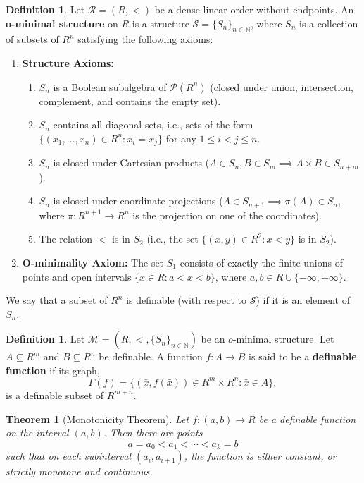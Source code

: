 \documentclass{amsart}
\numberwithin{equation}{subsection}
\theoremstyle{plain}
\newtheorem{thm}[subsection]{Theorem}
\theoremstyle{definition}
\newtheorem{defn}[subsection]{Definition}
\theoremstyle{remark}
\begin{document}
\begin{defn} Let $\mathcal{R}=(R,<)$ be a dense linear order without endpoints. An \textbf{o-minimal structure} on $R$ is a structure $\mathcal{S} = \{S_n\}_{n \in \mathbb{N}}$, where $S_n$ is a collection of subsets of $R^n$ satisfying the following axioms:
\begin{enumerate}
\item \textbf{Structure Axioms:}
\begin{enumerate}
\item $S_n$ is a Boolean subalgebra of $\mathcal{P}(R^n)$ (closed under union, intersection, complement, and contains the empty set).
\item $S_n$ contains all diagonal sets, i.e., sets of the form $\{(x_1, \dots, x_n) \in R^n : x_i = x_j\}$ for any $1 \leq i < j \leq n$.
\item $S_n$ is closed under Cartesian products ($A \in S_n, B \in S_m \implies A \times B \in S_{n+m}$).
\item $S_n$ is closed under coordinate projections ($A \in S_{n+1} \implies \pi(A) \in S_n$, where $\pi: R^{n+1} \to R^n$ is the projection on one of the coordinates).
\item The relation $<$ is in $S_2$ (i.e., the set $\{(x,y) \in R^2 : x < y\}$ is in $S_2$).
\end{enumerate}
\item \textbf{O-minimality Axiom:}
The set $S_1$ consists of exactly the finite unions of points and open intervals $\{x \in R : a < x < b\}$, where $a, b \in R \cup \{-\infty, +\infty\}$.
\end{enumerate}
We say that a subset of $R^n$ is definable (with respect to $\mathcal S$) if it is an element of $S_n$. 
\end{defn}
\begin{defn} Let $\mathcal{M} = (R, <, \{S_n\}_{n \in \mathbb{N}})$ be an $o$-minimal structure. Let $A \subseteq R^m$ and $B\subseteq R^n$ be definable. A function $f: A \to B$ is said to be a \textbf{definable function} if its graph,
\[
\Gamma(f) = \{(\bar{x}, f(\bar{x})) \in R^m \times R^n : \bar{x} \in A\},
\]
is a definable subset of $R^{m+n}$.
\end{defn}
\begin{thm}[Monotonicity Theorem] Let $f:(a,b) \to R$ be a definable function on the interval $(a,b)$. Then there are points
\[
a = a_0 < a_1 < \cdots < a_k = b
\]
such that on each subinterval $(a_i, a_{i+1})$,
the function is either constant, or strictly monotone and continuous.
\end{thm}
\end{document}
